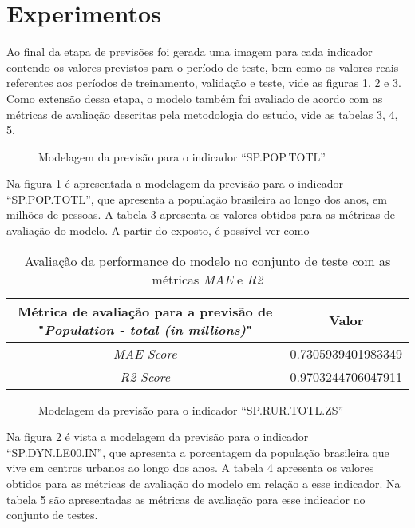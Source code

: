 \section{Experimentos}

Ao final da etapa de previsões foi gerada uma imagem para 
cada indicador contendo os valores previstos para o período 
de teste, bem como os valores reais referentes aos períodos de 
treinamento, validação e teste, vide as figuras 1, 2 e 3.  
Como extensão dessa etapa, o modelo também foi avaliado de acordo 
com as métricas de avaliação descritas pela metodologia do estudo, 
vide as tabelas 3, 4, 5.

\begin{figure}[h]
    \caption{Modelagem da previsão para o indicador “SP.POP.TOTL”}
\end{figure}

Na figura 1 é apresentada a modelagem da previsão para o indicador “SP.POP.TOTL”, 
que apresenta a população brasileira ao longo dos anos, em milhões de pessoas. 
A tabela 3 apresenta os valores obtidos para as métricas de avaliação do modelo. 
A partir do exposto, é possível ver como

\begin{table}[h]
    \centering
    \begin{tabular}{|c|c|}
        \hline
        \multicolumn{1}{|p{4cm}|}{Métrica de avaliação para a previsão de "\emph{Population - total (in millions)}"} & Valor \\
        \hline 
        \emph{MAE Score} & 0.7305939401983349 \\
        \hline
        \emph{R2 Score} &  0.9703244706047911 \\
        \hline
    \end{tabular}
    \caption{Avaliação da performance do modelo no conjunto de teste com as métricas \emph{MAE} e \emph{R2}}
\end{table}

\begin{figure}[h]
    \caption{Modelagem da previsão para o indicador “SP.RUR.TOTL.ZS”}
\end{figure}

Na figura 2 é vista a modelagem da previsão para o indicador “SP.DYN.LE00.IN”, 
que apresenta a porcentagem da população brasileira que vive em centros urbanos 
ao longo dos anos. A tabela 4 apresenta os valores obtidos para as métricas de 
avaliação do modelo em relação a esse indicador. Na tabela 5 são apresentadas 
as métricas de avaliação para esse indicador no conjunto de testes.

